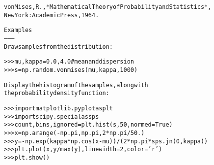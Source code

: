 \begin{boxedminipage}{\funcwidth}
\begin{alltt}
von Mises, R., *Mathematical Theory of Probability and Statistics*,
New York: Academic Press, 1964.

Examples
--------
Draw samples from the distribution:

{\textgreater}{\textgreater}{\textgreater} mu, kappa = 0.0, 4.0 \# mean and dispersion
{\textgreater}{\textgreater}{\textgreater} s = np.random.vonmises(mu, kappa, 1000)

Display the histogram of the samples, along with
the probability density function:

{\textgreater}{\textgreater}{\textgreater} import matplotlib.pyplot as plt
{\textgreater}{\textgreater}{\textgreater} import scipy.special as sps
{\textgreater}{\textgreater}{\textgreater} count, bins, ignored = plt.hist(s, 50, normed=True)
{\textgreater}{\textgreater}{\textgreater} x = np.arange(-np.pi, np.pi, 2*np.pi/50.)
{\textgreater}{\textgreater}{\textgreater} y = -np.exp(kappa*np.cos(x-mu))/(2*np.pi*sps.jn(0,kappa))
{\textgreater}{\textgreater}{\textgreater} plt.plot(x, y/max(y), linewidth=2, color='r')
{\textgreater}{\textgreater}{\textgreater} plt.show()
\end{alltt}

\setlength{\parskip}{1ex}
    \end{boxedminipage}

    \label{QSTK:qstklearn:mldiagnostics:wald}

    \vspace{0.5ex}

